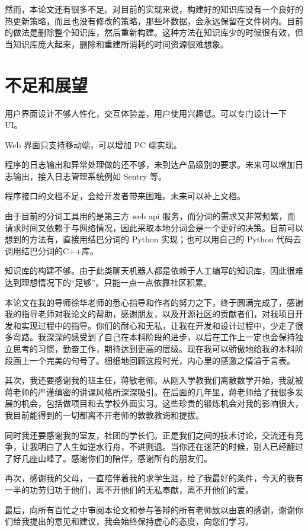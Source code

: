 \documentclass[bachelor,winfonts]{jnuthesis}
\begin{document}
然而，本论文还有很多不足。对目前的实现来说，构建好的知识库没有一个良好的热更新策略，而且也没有修改的策略，那些坏数据，会永远保留在文件树内。目前的做法是删除整个知识库，然后重新构建。这种方法在知识库少的时候很有效，但当知识库庞大起来，删除和重建所消耗的时间资源很难想象。

\section{不足和展望}

用户界面设计不够人性化，交互体验差，用户使用兴趣低。可以专门设计一下 UI。

Web 界面只支持移动端，可以增加 PC 端实现。

程序的日志输出和异常处理做的还不够，未到达产品级别的要求。未来可以增加日志输出，接入日志管理系统例如 Sentry 等。

程序接口的文档不足，会给开发者带来困难。未来可以补上文档。

由于目前的分词工具用的是第三方 web api 服务，而分词的需求又非常频繁，而请求时间又依赖于与网络情况，因此采取本地分词会是一个更好的决策。目前可以想到的方法有，直接用结巴分词的 Python 实现；也可以用自己的 Python 代码去调用结巴分词的C++库。

知识库的构建不够。由于此类聊天机器人都是依赖于人工编写的知识库，因此很难达到理想情况下的“足够”。只能一点一点依靠社区积累。

\nocite{*}


\begin{acknowledgement}
  本论文在我的导师徐华老师的悉心指导和作者的努力之下，终于圆满完成了，感谢我的指导老师对我论文的帮助，感谢朋友，以及开源社区的贡献者们，对我项目开发和实现过程中的指导。你们的耐心和无私，让我在开发和设计过程中，少走了很多弯路。我深深的感受到了自己在本科阶段的进步，以后在工作上一定也会保持独立思考的习惯，勤奋工作，期待达到更高的层级。现在我可以骄傲地给我的本科阶段画上一个完美的句号了。细细地回顾这段时光，内心里的感激之情溢于言表。

  其次，我还要感谢我的班主任，蒋敏老师。从刚入学教我们离散数学开始，我就被蒋老师的严谨缜密的讲课风格所深深吸引。在后面的几年里，蒋老师给了我很多发展的机会，包括做项目和去学校外面实习。这些珍贵的锻炼机会对我的影响很大，我目前能得到的一切都离不开老师的敦敦教诲和提拔。

  同时我还要感谢我的室友，社团的学长们。正是我们之间的技术讨论，交流还有竞争，让我明白了人生如逆水行舟，不进则退。当你还在迷茫的时候，别人已经翻过了好几座山峰了。感谢你们的陪伴，感谢所有的朋友们。

  再次，感谢我的父母，一直陪伴着我的求学生涯，给了我最好的条件，今天的我有一半的功劳归功于他们，离不开他们的无私奉献，离不开他们的爱。

  最后，向所有百忙之中审阅本论文和参与答辩的所有老师致以由衷的感谢，谢谢你们给我提出的意见和建议，我会始终保持虚心的态度，向您们学习。

\end{acknowledgement}
\end{document}
